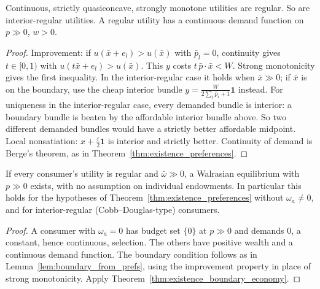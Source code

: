 \begin{lemma}
\label{lem:regular_from}
\leanok
{}
Continuous, strictly quasiconcave, strongly monotone utilities are regular. So are interior-regular utilities. A
regular utility has a continuous demand function on $p \gg 0$, $w > 0$.
\end{lemma}
\begin{proof}
\leanok
Improvement: if $u(\bar x + e_l) > u(\bar x)$ with $\bar p_l = 0$, continuity gives $t \in [0,1)$ with
$u(t\bar x + e_l) > u(\bar x)$. This $y$ costs $t\,\bar p\cdot\bar x < W$. Strong monotonicity gives the first inequality. In the
interior-regular case it holds when $\bar x \gg 0$; if $\bar x$ is on the boundary, use the cheap interior bundle
$y = \frac{W}{2\sum_i \bar p_i + 1}\mathbf 1$ instead. For uniqueness in the interior-regular case, every demanded bundle is
interior: a boundary bundle is beaten by the affordable interior bundle above. So two different demanded bundles would
have a strictly better affordable midpoint. Local nonsatiation: $x + \frac{\varepsilon}{2}\mathbf 1$ is interior and
strictly better. Continuity of demand is Berge's theorem, as in Theorem~\ref{thm:existence_preferences}.
\end{proof}

\begin{theorem}
\label{thm:existence_regular}
\leanok
{}
If every consumer's utility is regular and $\bar\omega \gg 0$, a Walrasian equilibrium with $p \gg 0$ exists, with no
assumption on individual endowments. In particular this holds for the hypotheses of Theorem~\ref{thm:existence_preferences}
without $\omega_a \ne 0$, and for interior-regular (Cobb--Douglas-type) consumers.
\end{theorem}
\begin{proof}
\leanok
A consumer with $\omega_a = 0$ has budget set $\{0\}$ at $p \gg 0$ and demands $0$, a constant, hence continuous, selection.
The others have positive wealth and a continuous demand function. The boundary condition follows as in
Lemma~\ref{lem:boundary_from_prefs}, using the improvement property in place of strong monotonicity. Apply
Theorem~\ref{thm:existence_boundary_economy}.
\end{proof}

